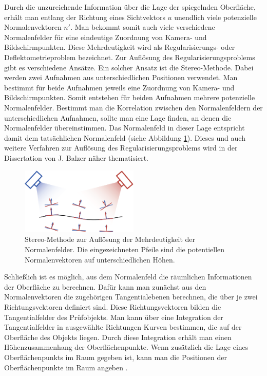 \p
Durch die unzureichende Information über die Lage der spiegelnden Oberfläche, erhält man entlang der Richtung eines Sichtvektors $u$ unendlich viele potenzielle Normalenvektoren $n'$.
Man bekommt somit auch viele verschiedene Normalenfelder für eine eindeutige Zuordnung von Kamera- und Bildschirmpunkten.
Diese Mehrdeutigkeit wird als Regularisierungs- oder Deflektometrieproblem bezeichnet.
Zur Auflösung des Regularisierungsproblems gibt es verschiedene Ansätze.
Ein solcher Ansatz ist die Stereo-Methode.
Dabei werden zwei Aufnahmen aus unterschiedlichen Positionen verwendet.
Man bestimmt für beide Aufnahmen jeweils eine Zuordnung von Kamera- und Bildschirmpunkten.
Somit entstehen für beiden Aufnahmen mehrere potenzielle Normalenfelder.
Bestimmt man die Korrelation zwischen den Normalenfeldern der unterschiedlichen Aufnahmen, sollte man eine Lage finden, an denen die Normalenfelder übereinstimmen.
Das Normalenfeld in dieser Lage entspricht damit dem tatsächlichen Normalenfeld (siehe Abbildung \ref{img:stereoVerfahren}).
Dieses und auch weitere Verfahren zur Auflösung des Regularisierungsproblems wird in der Dissertation von J. Balzer näher thematisiert\cite{regularisierungsproblem}.
%
\begin{figure}[H]
	\centering
	\includegraphics[width=0.5\textwidth]{02_grundlagenDerDeflektometrie/rekonstruktion/rekonstruktionUndRegularisierungsproblem/figures/stereoVerfahren}
	\caption[Stereo-Methode zur Lösung des Regularisierungsproblems]{Stereo-Methode zur Auflösung der Mehrdeutigkeit der Normalenfelder. Die eingezeichneten Pfeile sind die potentiellen Normalenvektoren auf unterschiedlichen Höhen. \cite{stereoDeflektometrie}}
	\label{img:stereoVerfahren}
\end{figure}
%
\noindent
Schließlich ist es möglich, aus dem Normalenfeld die räumlichen Informationen der Oberfläche zu berechnen.
Dafür kann man zunächst aus den Normalenvektoren die zugehörigen Tangentialebenen berechnen, die über je zwei Richtungsvektoren definiert sind.
Diese Richtungsvektoren bilden die Tangentialfelder des Prüfobjekts.
Man kann über eine Integration der Tangentialfelder in ausgewählte Richtungen Kurven bestimmen, die auf der Oberfläche des Objekts liegen.
Durch diese Integration erhält man einen Höhenzusammen\-hang der Oberflächenpunkte.
Wenn zusätzlich die Lage eines Oberflächenpunkts im Raum gegeben ist, kann man die Positionen der Oberflächenpunkte im Raum angeben \cite{kit_werling}.